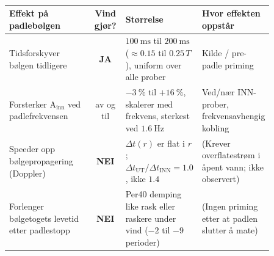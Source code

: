 \begin{table}[hbt]
  \centering
  \small
  \caption[Vindeffekter på padlebølgen — oppsummering]{
  }
  \label{tab:ch04_wind_effects_scoreboard}
  \begin{tabular}{p{0.32\linewidth} c p{0.27\linewidth} p{0.27\linewidth}}
    \toprule
    Effekt på padlebølgen &
      Vind gjør? &
      Størrelse &
      Hvor effekten oppstår \\
    \midrule
    Tidsforskyver bølgen tidligere &
      \textbf{JA} &
      $\qty{100}{\milli\second}$ til $\qty{200}{\milli\second}$
        ($\approx \num{0.15}$ til $\num{0.25}\,T$),
        uniform over alle prober &
      Kilde / pre-padle priming \\[0.5em]

    Forsterker A$_{\text{inn}}$ ved padlefrekvensen &
      av og til &
      $-\qty{3}{\percent}$ til $+\qty{16}{\percent}$,
        skalerer med frekvens, sterkest ved $\qty{1.6}{\hertz}$ &
      Ved/nær INN-prober, frekvensavhengig kobling \\[0.5em]

    Speeder opp bølgepropagering (Doppler) &
      \textbf{NEI} &
      $\Delta t(r)$ er flat i $r$;
        $\Delta t_{\text{UT}}/\Delta t_{\text{INN}} = \num{1.0}$,
        ikke $\num{1.4}$ &
      (Krever overflate\-strøm i åpent vann; ikke observert) \\[0.5em]

    Forlenger bølgetogets levetid etter padlestopp &
      \textbf{NEI} &
      Per40 demping like rask eller raskere under vind
        ($-2$ til $-9$ perioder) &
      (Ingen priming etter at padlen slutter å mate) \\
    \bottomrule
  \end{tabular}
\end{table}
